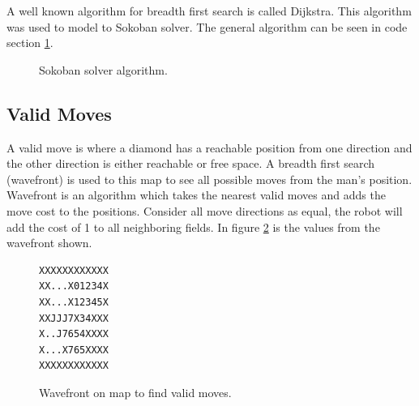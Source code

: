 A well known algorithm for breadth first search is called Dijkstra.
This algorithm was used to model to Sokoban solver.
The general algorithm can be seen in code section \ref{code:sokoban_solver}.

\begin{figure}[h]
\renewcommand\figurename{Code Section}
\centering
{}
 \caption{Sokoban solver algorithm.}
 \label{code:sokoban_solver}
\end{figure}

\subsection{Valid Moves}
A valid move is where a diamond has a reachable position from one direction and the other direction is either reachable or free space.
A breadth first search (wavefront) is used to this map to see all possible moves from the man's position.
Wavefront is an algorithm which takes the nearest valid moves and adds the move cost to the positions.
Consider all move directions as equal, the robot will add the cost of 1 to all neighboring fields.
In figure \ref{fig:wavefront} is the values from the wavefront shown.

\begin{figure}[h]
 \centering
 \begin{minipage}{0.1\textwidth}
\begin{verbatim}
XXXXXXXXXXXX
XX...X01234X
XX...X12345X
XXJJJ7X34XXX
X..J7654XXXX
X...X765XXXX
XXXXXXXXXXXX
\end{verbatim}
 \end{minipage}
 \caption{Wavefront on map to find valid moves.}
 \label{fig:wavefront}
\end{figure}

